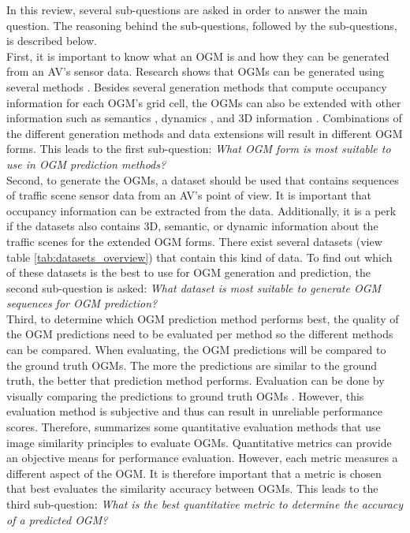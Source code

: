 In this review, several sub-questions are asked in order to answer the main question. The reasoning behind the sub-questions, followed by the sub-questions, is described below. \\ 

First, it is important to know what an \gls{OGM} is and how they can be generated from an \gls{AV}'s sensor data. Research shows that \glspl{OGM} can be generated using several methods \cite{collins2007occupancy} \cite{ribo2001comparison} \cite{thrun2003learning}. Besides several generation methods that compute occupancy information for each \gls{OGM}'s grid cell, the \glspl{OGM} can also be extended with other information such as semantics \cite{lu2019monocular}, dynamics \cite{nuss2018random}, and 3D information \cite{degerman20163d}. Combinations of the different generation methods and data extensions will result in different \gls{OGM} forms. This leads to the first sub-question: \textit{What \gls{OGM} form is most suitable to use in \gls{OGM} prediction methods?} \\

Second, to generate the \glspl{OGM}, a dataset should be used that contains sequences of traffic scene sensor data from an \gls{AV}'s point of view. It is important that occupancy information can be extracted from the data. Additionally, it is a perk if the datasets also contains 3D, semantic, or dynamic information about the traffic scenes for the extended \gls{OGM} forms. There exist several datasets (view table \ref{tab:datasets_overview}) that contain this kind of data. To find out which of these datasets is the best to use for \gls{OGM} generation and prediction, the second sub-question is asked: \textit{What dataset is most suitable to generate OGM sequences for OGM prediction?} \\

Third, to determine which \gls{OGM} prediction method performs best, the quality of the \gls{OGM} predictions need to be evaluated per method so the different methods can be compared. When evaluating, the \gls{OGM} predictions will be compared to the ground truth \glspl{OGM}. The more the predictions are similar to the ground truth, the better that prediction method performs. Evaluation can be done by visually comparing the predictions to ground truth \glspl{OGM} \cite{ribo2001comparison}. However, this evaluation method is subjective and thus can result in unreliable performance scores. Therefore, \cite{collins2007occupancy} summarizes some quantitative evaluation methods that use image similarity principles to evaluate \glspl{OGM}. Quantitative metrics can provide an objective means for performance evaluation. However, each metric measures a different aspect of the \gls{OGM}. It is therefore important that a metric is chosen that best evaluates the similarity accuracy between \glspl{OGM}. This leads to the third sub-question: \textit{What is the best quantitative metric to determine the accuracy of a predicted OGM?} \\

